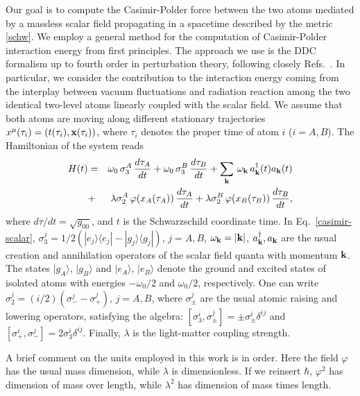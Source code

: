 \documentclass[twocolumn,prd,aps,showpacs,amsmath,amssymb]{revtex4-1}
\def\bea{\begin{eqnarray}}
\def\eea{\end{eqnarray}}
\def\nn{\nonumber}
\begin{document}
Our goal is to compute the Casimir-Polder force between the two
atoms mediated by a massless scalar field propagating in a spacetime
described by the metric
\eqref{schw}. We employ a general method for the computation of
Casimir-Polder interaction energy from first principles. The approach
we use is the DDC formalism up to fourth order in perturbation theory,
following closely  Refs.~\cite{marino, noto}. In
particular, we consider the contribution to the interaction energy
coming from the interplay between vacuum fluctuations and radiation
reaction among the two identical two-level atoms linearly coupled
with the  scalar field. We assume that both atoms are moving along
different stationary trajectories $x^{\mu}(\tau_i) = (t(\tau_i),{\bf
  x}(\tau_i))$, where $\tau_i$ denotes the proper time of atom
$i$ ($i=A, B$). The Hamiltonian of the system reads~\cite{Rizzuto}
%
\bea
H(t) &=& \omega_0\,\sigma_{3}^{A}\,\frac{d\tau_A}{dt} +
\omega_0\,\sigma_{3}^{B}\,\frac{d\tau_B}{dt}  
+ \sum_{{\bf k}}\, \omega_{{\bf k}}\,a^{\dagger}_{{\bf k}}(t)a_{{\bf k}}(t) 
\nn\\ 
&+& \lambda\sigma_{2}^{A}\,\varphi(x_{A}(\tau_{A}))\,\frac{d\tau_A}{dt} 
+ \lambda\sigma_{2}^{B}\,\varphi(x_{B}(\tau_{B}))\,\frac{d\tau_B}{dt},
\label{casimir-scalar} 
\eea
%
where $d\tau/dt  = \sqrt{g_{00}} $, and $t$ is the Schwarzschild
coordinate time. In Eq.~\eqref{casimir-scalar}, $\sigma_{3}^{j} =
1/2\left(|e_{j}\rangle\langle e_{j}| -   
|g_{j}\rangle\langle g_{j}|\right)$, $j = A, B$, $\omega_{{\bf k}} =
|{\bf k}|$, $a^{\dagger}_{{\bf k}}, a_{{\bf k}}$ are the usual
creation and annihilation operators of the scalar field quanta with
momentum $\bf k$.  The states $|g_A\rangle$, $|g_B\rangle$ and
$|e_A\rangle$, $|e_B\rangle$ denote the ground and excited states of
isolated atoms with energies $-\omega_0/2$ and $\omega_0/2$,
respectively. One can write $\sigma_{2}^{j} = (i/2)(\sigma_{-}^{j} -
\sigma_{+}^{j})$, $j = A, B$, where $\sigma_{\pm}^{j}$ are the usual
atomic raising and lowering operators, satisfying the algebra:
$[\sigma_{3}^{i},\sigma_{\pm}^{j}] = \pm \sigma_{\pm}^{i}\delta^{ij}$
and  
$[\sigma_{+}^{i},\sigma_{-}^{j}] = 2\sigma_{3}^{i}\delta^{ij}$.
Finally, $\lambda$ is the light-matter coupling strength. 

A brief comment on the units employed in this work is in order. Here the field $\varphi$ has the usual mass
dimension, while $\lambda$ is dimensionless. If we reinsert $\hbar$, $\varphi^2$
 has dimension of mass over length, while $\lambda^2$ has dimension of
 mass times length.
\end{document}
